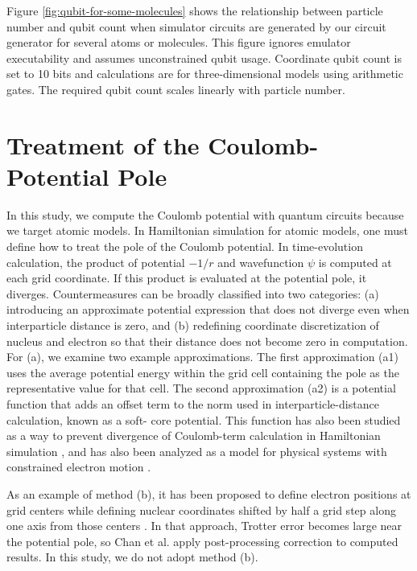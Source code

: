 \documentclass[a4paper,11pt]{article}
\begin{document}
Figure \ref{fig:qubit-for-some-molecules} shows the relationship between
particle number and qubit count when simulator circuits are generated by our
circuit generator for several atoms or molecules. This figure ignores emulator
executability and assumes unconstrained qubit usage. Coordinate qubit count is
set to 10 bits and calculations are for three-dimensional models using
arithmetic gates. The required qubit count scales linearly with particle number.
\clearpage


\section{Treatment of the Coulomb-Potential Pole}
\label{sec:coulomb-potential-handling}
In this study, we compute the Coulomb potential with quantum circuits because we
target atomic models. In Hamiltonian simulation for atomic models, one must
define how to treat the pole of the Coulomb potential. In time-evolution
calculation, the product of potential $-1/r$ and wavefunction $\psi$ is computed
at each grid coordinate. If this product is evaluated at the potential pole, it
diverges. Countermeasures can be broadly classified into two categories:
(a) introducing an approximate potential expression that does not diverge even
when interparticle distance is zero, and
(b) redefining coordinate discretization of nucleus and electron so that their
distance does not become zero in computation. For (a), we examine two example
approximations. The first approximation (a1) uses the average potential energy
within the grid cell containing the pole as the representative value for that
cell. The second approximation (a2) is a potential function that adds an offset
term to the norm used in interparticle-distance calculation, known as a soft-
core potential. This function has also been studied as a way to prevent
divergence of Coulomb-term calculation in Hamiltonian simulation
\cite{Childs2022quantumsimulationof,Kivlichan_2017},
and has also been analyzed as a model for physical systems with constrained
electron motion \cite{Hall2009.PhysRevA.80.032507,
Fernandez_1991, LiChen2021.doi:10.1021/acs.jpca.1c00698}.

As an example of method (b), it has been proposed to define electron positions
at grid centers while defining nuclear coordinates shifted by half a grid step
along one axis from those centers \cite{Chan2023.sciadv.abo7484}. In that
approach, Trotter error becomes large near the potential pole, so Chan et al.
apply post-processing correction to computed results. In this study, we do not
adopt method (b).
\end{document}

